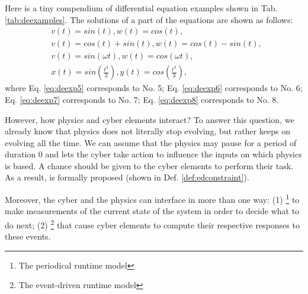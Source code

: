 Here is a tiny compendium of differential equation examples shown in Tab. \ref{tab:deexamples}.
The solutions of a part of the equations are shown as follows:
\begin{align}
  &v(t) = sin(t), w(t) = cos(t) \text{, } \label{eq:deexp5} \\
  &v(t) = cos(t) + sin(t), w(t) = cos(t) - sin(t) \text{, } \label{eq:deexp6} \\
  &v(t) = sin(\omega t), w(t) = cos(\omega t) \text{, } \label{eq:deexp7} \\
  &x(t) = sin(\frac{t^3}{3}), y(t) = cos(\frac{t^3}{3}) \text{, } \label{eq:deexp8}
\end{align}
where Eq. \ref{eq:deexp5} corresponds to No. 5; 
Eq. \ref{eq:deexp6} corresponds to No. 6;
Eq. \ref{eq:deexp7} corresponds to No. 7;
Eq. \ref{eq:deexp8} corresponds to No. 8.

However, how physics and cyber elements interact?
To answer this question, we already know that physics does not literally stop evolving, but rather keeps on evolving all the time.
We can assume that the physics may pause for a period of duration 0 and lets the cyber take action to influence the inputs on which physics is based.
A chance should be given to the cyber elements to perform their task.
As a result,  is formally proposed (shown in Def. \ref{def:edconstraint}).

Moreover, the cyber and the physics can interface in more than one way: 
(1) \footnote{The periodical runtime model}
 to make measurements of the current state of the system in order to decide what to do next;
(2) \footnote{The event-driven runtime model}
 that cause cyber elements to compute their respective responses to these events.


